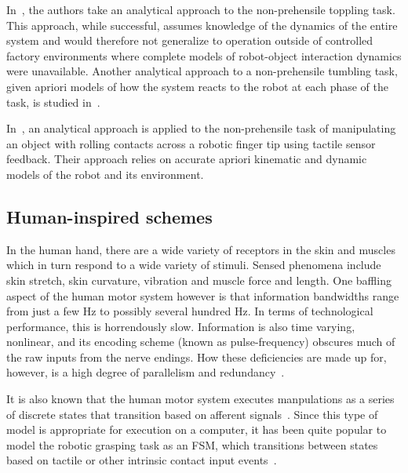In~\cite{Lynch1999}, the authors take an analytical approach to the non-prehensile toppling task. 
This approach, while successful, assumes knowledge of the dynamics of the entire system and would therefore not generalize to operation outside of controlled factory environments where complete models of robot-object interaction dynamics were unavailable.
Another analytical approach to a non-prehensile tumbling task, given apriori models of how the system reacts to the robot at each phase of the task, is studied in~\cite{sawasaki1989tumbling}.

In~\cite{Zhang2012}, an analytical approach is applied to the non-prehensile task of manipulating an object with rolling contacts across a robotic finger tip using tactile sensor feedback.
Their approach relies on accurate apriori kinematic and dynamic models of the robot and its environment.

\subsection{Human-inspired schemes}

In the human hand, there are a wide variety of receptors in the skin and muscles which in turn respond to a wide variety of stimuli.
Sensed phenomena include skin stretch, skin curvature, vibration and muscle force and length.
One baffling aspect of the human motor system however is that information bandwidths range from just a few Hz to possibly several hundred Hz.
In terms of technological performance, this is horrendously slow.
Information is also time varying, nonlinear, and its encoding scheme (known as pulse-frequency) obscures much of the raw inputs from the nerve endings.
How these deficiencies are made up for, however, is a high degree of parallelism and redundancy~\cite{howe1993tactile}.

It is also known that the human motor system executes manpulations as a series of discrete states that transition based on afferent signals~\cite{Johansson1984}.
Since this type of model is appropriate for execution on a computer, it has been quite popular to model the robotic grasping task as an FSM, which transitions between states based on tactile or other intrinsic contact input events~\cite{leoni1998implementing, sikka1994tactile}.


